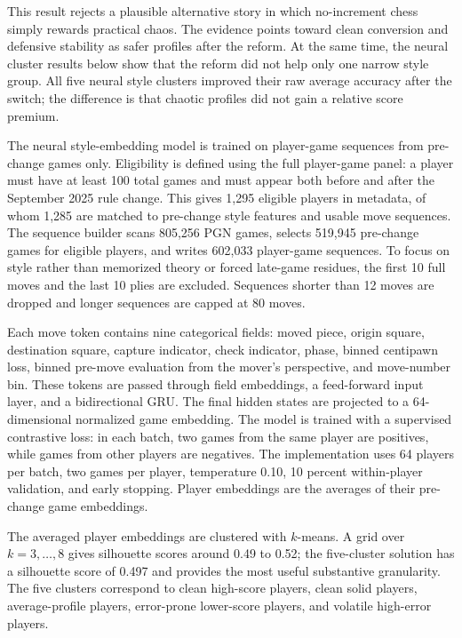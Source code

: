 This result rejects a plausible alternative story in which no-increment chess simply rewards practical chaos. The evidence points toward clean conversion and defensive stability as safer profiles after the reform. At the same time, the neural cluster results below show that the reform did not help only one narrow style group. All five neural style clusters improved their raw average accuracy after the switch; the difference is that chaotic profiles did not gain a relative score premium.

The neural style-embedding model is trained on player-game sequences from pre-change games only. Eligibility is defined using the full player-game panel: a player must have at least 100 total games and must appear both before and after the September 2025 rule change. This gives 1,295 eligible players in metadata, of whom 1,285 are matched to pre-change style features and usable move sequences. The sequence builder scans 805,256 PGN games, selects 519,945 pre-change games for eligible players, and writes 602,033 player-game sequences. To focus on style rather than memorized theory or forced late-game residues, the first 10 full moves and the last 10 plies are excluded. Sequences shorter than 12 moves are dropped and longer sequences are capped at 80 moves.

Each move token contains nine categorical fields: moved piece, origin square, destination square, capture indicator, check indicator, phase, binned centipawn loss, binned pre-move evaluation from the mover's perspective, and move-number bin. These tokens are passed through field embeddings, a feed-forward input layer, and a bidirectional GRU. The final hidden states are projected to a 64-dimensional normalized game embedding. The model is trained with a supervised contrastive loss: in each batch, two games from the same player are positives, while games from other players are negatives. The implementation uses 64 players per batch, two games per player, temperature 0.10, 10 percent within-player validation, and early stopping. Player embeddings are the averages of their pre-change game embeddings.

The averaged player embeddings are clustered with \(k\)-means. A grid over \(k=3,\ldots,8\) gives silhouette scores around 0.49 to 0.52; the five-cluster solution has a silhouette score of 0.497 and provides the most useful substantive granularity. The five clusters correspond to clean high-score players, clean solid players, average-profile players, error-prone lower-score players, and volatile high-error players.

